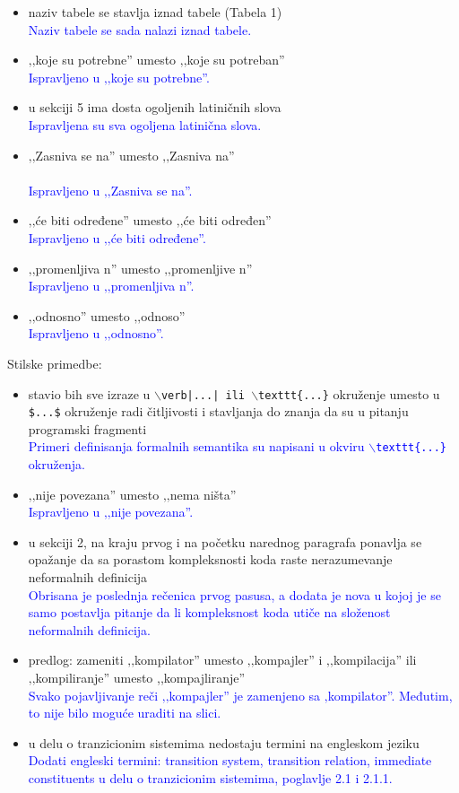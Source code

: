 \documentclass[a4paper]{report}
\newcommand{\odgovor}[1]{\textcolor{blue}{#1}}
\begin{document}
\begin{itemize}
	\item naziv tabele se stavlja iznad tabele (Tabela 1)\\
	\odgovor{Naziv tabele se sada nalazi iznad tabele.}
	\item ‚‚koje su potrebne'' umesto ‚‚koje su potreban''\\
	\odgovor{Ispravljeno u ‚‚koje su potrebne''.}
	\item u sekciji 5 ima dosta ogoljenih latiničnih slova \\
	\odgovor{Ispravljena su sva ogoljena latinična slova.}
	\item ‚‚Zasniva se na'' umesto ‚‚Zasniva na'' \\\\
	\odgovor{Ispravljeno u ‚‚Zasniva se na''.}
	\item ‚‚će biti određene'' umesto ‚‚će biti određen'' \\
	\odgovor{Ispravljeno u ‚‚će biti određene''. }
	\item ‚‚promenljiva n'' umesto ‚‚promenljive n'' \\
	\odgovor{Ispravljeno u  ‚‚promenljiva n''.}
	\item ‚‚odnosno'' umesto ‚‚odnoso'' \\
	\odgovor{Ispravljeno u ‚‚odnosno''. }
\end{itemize}

{Stilske primedbe:}
\begin{itemize}
	\item stavio bih sve izraze u {\tt $\backslash$verb|...| ili $\backslash$texttt\{...\}} okruženje umesto u {\tt \$...\$} okruženje radi čitljivosti i stavljanja do znanja da su u pitanju programski fragmenti\\
\odgovor{Primeri definisanja formalnih semantika su napisani u okviru {\tt $\backslash$texttt\{...\}} okruženja.}
	\item ‚‚nije povezana'' umesto ‚‚nema ništa''\\
	\odgovor{Ispravljeno u ‚‚nije povezana''.}
	\item u sekciji 2, na kraju prvog i na početku narednog paragrafa ponavlja se opažanje da sa porastom kompleksnosti koda raste nerazumevanje neformalnih definicija\\
	\odgovor{Obrisana je poslednja rečenica prvog pasusa, a dodata je nova u kojoj je se samo postavlja pitanje da li kompleksnost koda utiče na složenost neformalnih definicija.}
	\item predlog: zameniti ‚‚kompilator'' umesto ‚‚kompajler'' i ‚‚kompilacija'' ili ‚‚kompiliranje'' umesto ,,kompajliranje''\\
	 \odgovor{Svako pojavljivanje reči ‚‚kompajler'' je zamenjeno sa ‚kompilator''. Međutim, to nije bilo moguće uraditi na slici.}
	\item u delu o tranzicionim sistemima nedostaju termini na engleskom jeziku\\
\odgovor{Dodati engleski termini: transition system, transition relation, immediate constituents u delu o tranzicionim sistemima, poglavlje 2.1 i 2.1.1.}\\
\end{itemize}
\end{document}
